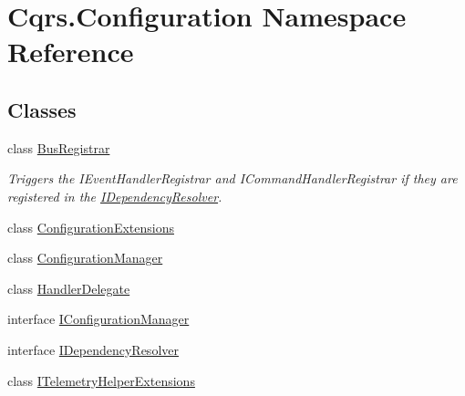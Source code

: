 \hypertarget{namespaceCqrs_1_1Configuration}{}\section{Cqrs.\+Configuration Namespace Reference}
\label{namespaceCqrs_1_1Configuration}
\subsection*{Classes}
\begin{DoxyCompactItemize}
\item 
class \hyperlink{classCqrs_1_1Configuration_1_1BusRegistrar}{Bus\+Registrar}
\begin{DoxyCompactList}\small\item\em Triggers the I\+Event\+Handler\+Registrar and I\+Command\+Handler\+Registrar if they are registered in the \hyperlink{interfaceCqrs_1_1Configuration_1_1IDependencyResolver}{I\+Dependency\+Resolver}. \end{DoxyCompactList}\item 
class \hyperlink{classCqrs_1_1Configuration_1_1ConfigurationExtensions}{Configuration\+Extensions}
\item 
class \hyperlink{classCqrs_1_1Configuration_1_1ConfigurationManager}{Configuration\+Manager}
\item 
class \hyperlink{classCqrs_1_1Configuration_1_1HandlerDelegate}{Handler\+Delegate}
\item 
interface \hyperlink{interfaceCqrs_1_1Configuration_1_1IConfigurationManager}{I\+Configuration\+Manager}
\item 
interface \hyperlink{interfaceCqrs_1_1Configuration_1_1IDependencyResolver}{I\+Dependency\+Resolver}
\item 
class \hyperlink{classCqrs_1_1Configuration_1_1ITelemetryHelperExtensions}{I\+Telemetry\+Helper\+Extensions}
\end{DoxyCompactItemize}
